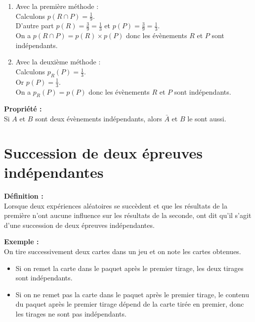 \documentclass{article}
\begin{document}
\begin{enumerate}
  \item Avec la première méthode : \\
  Calculons $p(R\cap P)=\frac{1}{9}$.\\
  D'autre part $p(R)=\frac{3}{9}=\frac{1}{3}$ et $p(P)=\frac{3}{9}=\frac{1}{3}$. \\
  On a $p(R\cap P)=p(R)\times p(P)$ donc les évènements $R$ et $P$ sont indépendants.
  \item Avec la deuxième méthode : \\
  Calculons $p_R(P)=\frac{1}{3}$.\\
  Or $p(P)=\frac{1}{3}$. \\
  On a $p_R(P)=p(P)$ donc les évènements $R$ et $P$ sont indépendants.
\end{enumerate}

\begin{mdframed}[style=proprieteStyle]
  \textbf{Propriété :} ~\\
  Si $A$ et $B$ sont deux évènements indépendants, alors $\bar A$ et $B$ le sont aussi.
\end{mdframed}

\section{Succession de deux épreuves indépendantes}

\begin{mdframed}[style=definitionStyle]
  \textbf{Définition :} ~\\
  Lorsque deux expériences aléatoires se succèdent et que les résultats de la première n'ont aucune influence sur les résultats de la seconde, ont dit qu'il s'agit d'une succession de deux épreuves indépendantes.
\end{mdframed}

\textbf{Exemple :} ~\\
On tire successivement deux cartes dans un jeu et on note les cartes obtenues.
\begin{itemize}
  \item Si on remet la carte dans le paquet après le premier tirage, les deux tirages sont indépendants.
  \item Si on ne remet pas la carte dans le paquet après le premier tirage, le contenu du paquet après le premier tirage dépend de la carte tirée en premier, donc les tirages ne sont pas indépendants.
\end{itemize}
\end{document}
